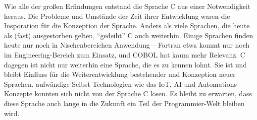\begin{appendices}
Wie alle der großen Erfindungen entstand die Sprache C aus einer Notwendigkeit heraus. Die Probleme und Umstände der Zeit ihrer Entwicklung waren die Insporation für die Konzeption der Sprache. Anders als viele Sprachen, die heute als (fast) ausgestorben gelten, \enquote{gedeiht} C auch weiterhin. Einige Sprachen finden heute nur noch in Nischenbereichen Anwendung -- Fortran etwa kommt nur noch im Engineering-Bereich zum Einsatz, und COBOL hat kaum mehr Relevanz. C dagegen ist nicht nur weiterhin eine Sprache, die es zu kennen lohnt. Sie ist und bleibt Einfluss für die Weiterentwicklung bestehender und Konzeption neuer Sprachen. aufwändige Selbst Technologien wie das IoT, AI und Automations-Konzepte konnten sich nicht von der Sprache C lösen. Es bleibt zu erwarten, dass diese Sprache auch lange in die Zukunft ein Teil der Programmier-Welt bleiben wird.
\end{appendices}
